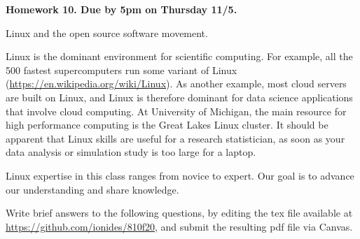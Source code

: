 \documentclass[12pt]{article}
\begin{document}
\begin{center}\bf
Homework 10. Due by 5pm on Thursday 11/5.

Linux and the open source software movement.

\end{center}

Linux is the dominant environment for scientific computing. For example, all the 500 fastest  supercomputers run some variant of Linux (\url{https://en.wikipedia.org/wiki/Linux}). As another example, most cloud servers are built on Linux, and Linux is therefore dominant for data science applications that involve cloud computing. At University of Michigan, the main resource for high performance computing is the Great Lakes Linux cluster. It should be apparent that Linux skills are useful for a research statistician, as soon as your data analysis or simulation study is too large for a laptop.

Linux expertise in this class ranges from novice to expert. Our goal is to advance our understanding and share knowledge.

Write brief answers to the following questions, by editing the tex file available at \url{https://github.com/ionides/810f20}, and submit the resulting pdf file via Canvas.
\end{document}
